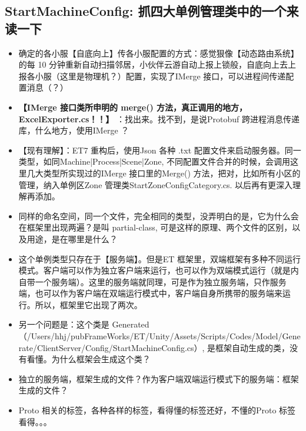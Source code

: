 \documentclass[9pt, b5paper]{article}
\begin{document}
\subsection{StartMachineConfig: 抓四大单例管理类中的一个来读一下}
\label{sec-2-9}
\begin{itemize}
\item 确定的各小服【自底向上】传各小服配置的方式：感觉狠像【动态路由系统】的每 10 分钟重新自动扫描邻居，小伙伴云游自动上报上锁般，自底向上去上报各小服（这里是物理机？）配置，实现了IMerge 接口，可以进程间传递配置消息（？）
\item \textbf{【IMerge 接口类所申明的 merge() 方法，真正调用的地方，ExcelExporter.cs！！】} ：找出来。找不到，是说Protobuf 跨进程消息传递库，什么地方，使用IMerge ？
\item 【现有理解】：ET7 重构后，使用Json 各种 .txt 配置文件来启动服务器。同一类型，如同Machine|Process|Scene|Zone, 不同配置文件合并的时候，会调用这里几大类型所实现过的IMerge 接口里的Merge() 方法，把对，比如所有小区的管理，纳入单例区Zone 管理类StartZoneConfigCategory.cs. 以后再有更深入理解再添加。
\item 同样的命名空间，同一个文件，完全相同的类型，没弄明白的是，它为什么会在框架里出现两遍？是叫 partial-class, 可是这样的原理、两个文件的区别，以及用途，是在哪里是什么？
\item 这个单例类型只存在于【服务端】。但是ET 框架里，双端框架有多种不同运行模式。客户端可以作为独立客户端来运行，也可以作为双端模式运行（就是内自带一个服务端）。这里的服务端就同理，可是作为独立服务端，只作服务端，也可以作为客户端在双端运行模式中，客户端自身所携带的服务端来运行。所以，框架里它出现了两次。
\item 另一个问题是：这个类是 Generated （/Users/hhj/pubFrameWorks/ET/Unity/Assets/Scripts/Codes/Model/Generate/ClientServer/Config/StartMachineConfig.cs）, 是框架自动生成的类，没有看懂。为什么框架会生成这个类？
\item 独立的服务端，框架生成的文件？作为客户端双端运行模式下的服务端：框架生成的文件？
\item Proto 相关的标签，各种各样的标签，看得懂的标签还好，不懂的Proto 标签看得。。。
\end{itemize}
\end{document}
